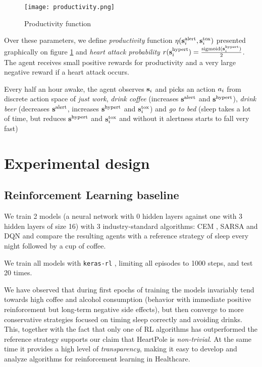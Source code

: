 \begin{figure}
    \centering
    \texttt{[image: productivity.png]}
    \caption{Productivity function}
    \label{fig:productivity}
\end{figure}

Over these parameters, we define \emph{productivity} function $\eta(\textbf{s}^\text{alert}_i, \textbf{s}^\text{tox}_i)$ presented graphically on figure \ref{fig:productivity} and \emph{heart attack probability} $r(\textbf{s}^\text{hypert}_i)=\frac{\text{sigmoid}(\textbf{s}^\text{hypert}_i)}{2}$.
The agent receives small positive rewards for productivity and a very large negative reward if a heart attack occurs.

Every half an hour awake, the agent observes $\textbf{s}_i$ and picks an action $a_i$ from discrete action space of \emph{just work}, \emph{drink coffee} (increases $\textbf{s}^\text{alert}$ and $\textbf{s}^\text{hypert}$), \emph{drink beer} (decreases $\textbf{s}^\text{alert}$, increases $\textbf{s}^\text{hypert}$ and $\textbf{s}^\text{tox}_i$) and \emph{go to bed} (sleep takes a lot of time, but reduces $\textbf{s}^\text{hypert}$ and $\textbf{s}^\text{tox}_i$ and without it alertness starts to fall very fast)

\newpage
\section{Experimental design}
\label{sec:heartpole-experiments}

\subsection{Reinforcement Learning baseline}
We train 2 models (a neural network with 0 hidden layers against one with 3 hidden layers of size 16) with 3 industry-standard algorithms: CEM \cite{szitaLearningTetrisUsing2006}, SARSA \cite[Chapter 6]{suttonReinforcementLearningSecond2018} and DQN \cite{mnihPlayingAtariDeep2013,dqn} and compare the resulting agents with a reference strategy of sleep every night followed by a cup of coffee.

We train all models with \texttt{keras-rl} \cite{KerasrlKerasrlDeep2025}, limiting all episodes to 1000 steps, and test 20 times.

We have observed that during first epochs of training the models invariably tend towards high coffee and alcohol consumption (behavior with immediate positive reinforcement but long-term negative side effects), but then converge to more conservative strategies focused on timing sleep correctly and avoiding drinks. 
This, together with the fact that only one of RL algorithms has outperformed the reference strategy supports our claim that HeartPole is \emph{non-trivial}.
At the same time it provides a high level of \emph{transparency}, making it easy to develop and analyze algorithms for reinforcement learning in Healthcare.

